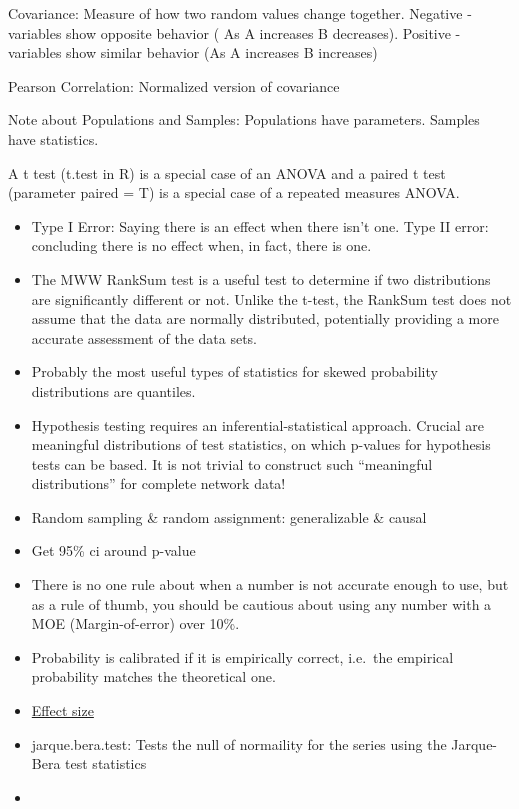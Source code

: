 \documentclass[]{book}
\begin{document}
Covariance: Measure of how two random values change together. Negative -
variables show opposite behavior ( As A increases B decreases). Positive
- variables show similar behavior (As A increases B increases)

Pearson Correlation: Normalized version of covariance

Note about Populations and Samples: Populations have parameters. Samples
have statistics.

A t test (t.test in R) is a special case of an ANOVA and a paired t test
(parameter paired = T) is a special case of a repeated measures ANOVA.

\begin{itemize}
\item
  Type I Error: Saying there is an effect when there isn't one. Type II
  error: concluding there is no effect when, in fact, there is one.
\item
  The MWW RankSum test is a useful test to determine if two
  distributions are significantly different or not. Unlike the t-test,
  the RankSum test does not assume that the data are normally
  distributed, potentially providing a more accurate assessment of the
  data sets.
\item
  Probably the most useful types of statistics for skewed probability
  distributions are quantiles.
\item
  Hypothesis testing requires an inferential-statistical approach.
  Crucial are meaningful distributions of test statistics, on which
  p-values for hypothesis tests can be based. It is not trivial to
  construct such ``meaningful distributions'' for complete network data!
\item
  Random sampling \& random assignment: generalizable \& causal
\item
  Get 95\% ci around p-value
\item
  There is no one rule about when a number is not accurate enough to
  use, but as a rule of thumb, you should be cautious about using any
  number with a MOE (Margin-of-error) over 10\%.
\item
  Probability is calibrated if it is empirically correct, i.e.~the
  empirical probability matches the theoretical one.
\item
  \href{https://artax.karlin.mff.cuni.cz/r-help/library/lsr/html/cohensD.html}{Effect
  size}
\item
  jarque.bera.test: Tests the null of normaility for the series using
  the Jarque-Bera test statistics
\item

\end{itemize}
\end{document}

